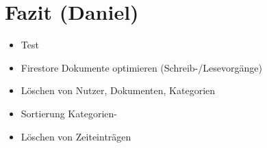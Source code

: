 \section{Fazit (Daniel)}\label{sec:fazit}
\begin{itemize}
    \item Test
    \item Firestore Dokumente optimieren (Schreib-/Lesevorgänge)
     \item Löschen von Nutzer, Dokumenten, Kategorien
    \item Sortierung Kategorien-
    \item Löschen von Zeiteinträgen 
\end{itemize}
